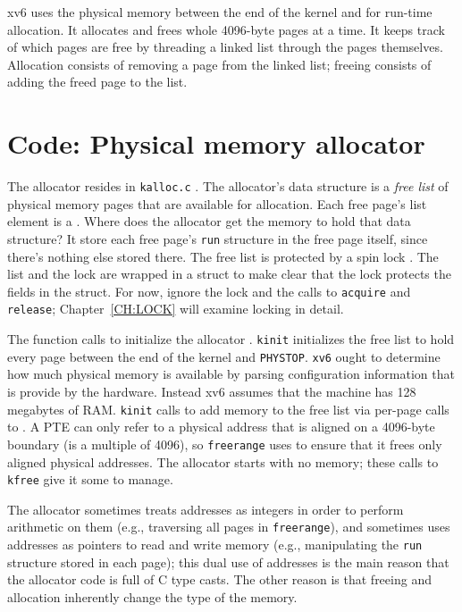 xv6 uses the physical memory between the end of the kernel and
for run-time allocation. It allocates and frees whole 4096-byte pages
at a time. It keeps track of which pages are free by threading a
linked list through the pages themselves. Allocation consists of
removing a page from the linked list; freeing consists of adding the
freed page to the list.
\section{Code: Physical memory allocator}

The allocator resides in {\tt kalloc.c} .
The allocator's data structure is a
\textit{free list}
of physical memory pages that are available
for allocation.
Each free page's list element is a
.
Where does the allocator get the memory
to hold that data structure?
It store each free page's
\lstinline{run}
structure in the free page itself,
since there's nothing else stored there.
The free list is
protected by a spin lock
.
The list and the lock are wrapped in a struct
to make clear that the lock protects the fields
in the struct.
For now, ignore the lock and the calls to
\lstinline{acquire}
and
\lstinline{release};
Chapter~\ref{CH:LOCK} will examine
locking in detail.

The function
calls
to initialize the allocator
.
\lstinline{kinit}
initializes the free list to hold
every page between the end of the kernel and {\tt PHYSTOP}.
\lstinline{xv6}
ought to determine how much physical
memory is available by parsing configuration information that
is provide by the hardware.
Instead xv6 assumes that the machine has
128 megabytes of RAM.
\lstinline{kinit}
calls
to add memory to the free list via per-page calls to
.
A PTE can only refer to a physical address that is aligned
on a 4096-byte boundary (is a multiple of 4096), so
\lstinline{freerange}
uses
to ensure that it frees only aligned physical addresses.
The allocator starts with no memory;
these calls to
\lstinline{kfree}
give it some to manage.

The allocator sometimes treats addresses as integers
in order to perform arithmetic on them (e.g.,
traversing all pages in
\lstinline{freerange}),
and sometimes uses addresses as pointers to read and
write memory (e.g., manipulating the
\lstinline{run}
structure stored in each page);
this dual use of addresses is the main reason that the
allocator code is full of C type casts.
The other reason is that freeing and allocation inherently
change the type of the memory.


